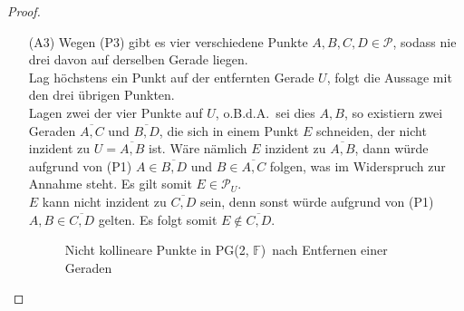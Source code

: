 \documentclass[hidelinks]{article}
\theoremstyle{plain}
\theoremstyle{definition}
\theoremstyle{rem}
\newcommand{\pgtwo}{PG(2, $\mathbb{F}$)\ }
\newcommand{\pu}{\mathcal{P}_U}
\begin{document}
\begin{sloppypar}
\begin{proof}
\begin{enumerate}
\begin{figure}[H]
 \caption{Parallelen in \pgtwo nach Entfernen einer Geraden}
\end{figure}
	\item[(A3)] Wegen (P3) gibt es vier verschiedene Punkte $A,B,C,D\in\mathcal{P}$, sodass nie drei davon auf derselben Gerade liegen.\\
		Lag höchstens ein Punkt auf der entfernten Gerade $U$, folgt die Aussage mit den drei übrigen Punkten.\\
		Lagen zwei der vier Punkte auf $U$, o.B.d.A.\ sei dies $A,B$, so existiern zwei Geraden $\overline{A,C}$ und $\overline{B,D}$, die sich in einem Punkt $E$ schneiden, der nicht inzident zu $U=\overline{A,B}$ ist.
		Wäre nämlich $E$ inzident zu $\overline{A,B}$, dann würde aufgrund von (P1) $A\in\overline{B,D}$ und $B\in\overline{A,C}$ folgen, was im Widerspruch zur Annahme steht. Es gilt somit $E\in\pu$.\\
$E$ kann nicht inzident zu $\overline{C,D}$ sein, denn sonst würde aufgrund von (P1) $A,B\in\overline{C,D}$ gelten. Es folgt somit $E\notin\overline{C,D}$.
\begin{figure}[H]
\centering
 \caption{Nicht kollineare Punkte in \pgtwo nach Entfernen einer Geraden}
\end{figure}


\end{enumerate}
\end{proof}
\end{sloppypar}
\end{document}
